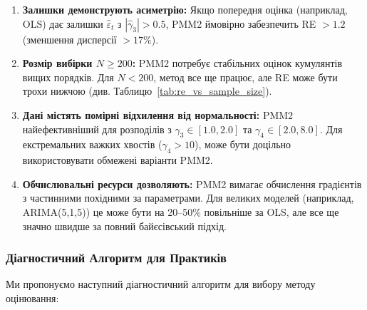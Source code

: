 \documentclass[12pt,a4paper]{article}
\begin{document}
	\begin{enumerate}
		\item \textbf{Залишки демонструють асиметрію:} Якщо попередня оцінка (наприклад, OLS) дає залишки $\hat{\varepsilon}_t$ з $|\hat{\gamma}_3| > 0.5$, PMM2 ймовірно забезпечить RE $> 1.2$ (зменшення дисперсії $> 17\%$).
		
		\item \textbf{Розмір вибірки $N \geq 200$:} PMM2 потребує стабільних оцінок кумулянтів вищих порядків. Для $N < 200$, метод все ще працює, але RE може бути трохи нижчою (див. Таблицю~\ref{tab:re_vs_sample_size}).
		
		\item \textbf{Дані містять помірні відхилення від нормальності:} PMM2 найефективніший для розподілів з $\gamma_3 \in [1.0, 2.0]$ та $\gamma_4 \in [2.0, 8.0]$. Для екстремальних важких хвостів ($\gamma_4 > 10$), може бути доцільно використовувати обмежені варіанти PMM2.
		
		\item \textbf{Обчислювальні ресурси дозволяють:} PMM2 вимагає обчислення градієнтів з частинними похідними за параметрами. Для великих моделей (наприклад, ARIMA(5,1,5)) це може бути на 20--50\% повільніше за OLS, але все ще значно швидше за повний байєсівський підхід.
	\end{enumerate}
	
	\subsubsection{Діагностичний Алгоритм для Практиків}
	
	Ми пропонуємо наступний діагностичний алгоритм для вибору методу оцінювання:
	
\end{document}
